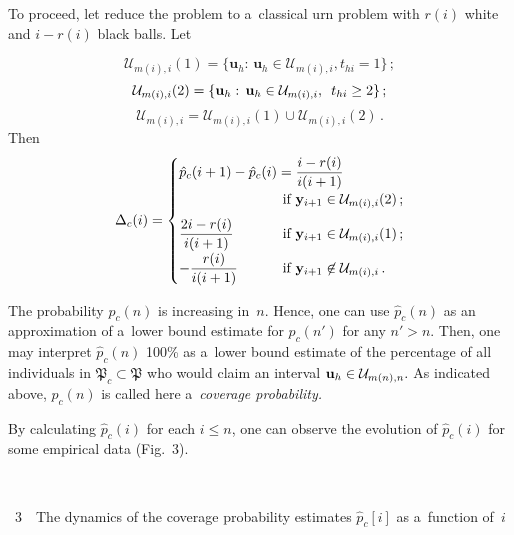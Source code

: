 \begin{multicols}{2}
To proceed, let reduce the problem to a~classical urn problem with $r(i)$
white and $i-r(i)$ black balls.
   Let 
   \pagebreak
   
   \noindent
   $$
   \mathcal{U}_{m(i), i} (1) =
   \{ \mathbf{u}_h :\, \mathbf{u}_h    \in\mathcal{U}_{m(i), i}, t_{hi} =1\}\,; 
$$
$$
\mathcal{U}_{m(i), i} (2) =\{ {\bf u}_h :\, {\bf u}_h
   \in\mathcal{U}_{m(i), i},\enskip t_{hi} \ge 2\}\,;
   $$
$$
\mathcal{U}_{m(i), i} =\mathcal{U}_{m(i), i} (1)\cup\mathcal{U}_{m(i), i}
   (2)\,.
   $$  
    Then
   $$
   \Delta_c(i) = 
   \begin{cases}
   \hat p_c(i+1) -\hat p_c (i) =\fr{i-r(i)}{i(i+1)}&\\[2pt]
&\hspace*{-20mm}     \mbox{ if }
   \mathbf{y}_{i+1} \in \mathcal{U}_{m(i), i}(2)\,;\\[6pt]
\fr{2i-r(i)}{i(i+1)} &\hspace*{-20mm}\mbox{ if } 
\mathbf{y}_{i+1} \in \mathcal{U}_{m(i), i}(1)\,;\\[6pt]
-\fr{r(i)}{i(i+1)} &   \hspace*{-20mm}\mbox{ if } 
 \mathbf{y}_{i+1} \not\in \mathcal{U}_{m(i), i}\,.
 \end{cases}
 $$

   The probability $p_c(n)$ is increasing in~$n.$ Hence, one can use $\hat p_c(n)$ as
an approximation of a~lower bound estimate for $p_c(n')$ for any 
  $n'> n.$ Then, one may   interpret $\hat p_c(n)$ 100\% as a~lower bound estimate of the
  percentage of all individuals in $\mathfrak P_c \subset \mathfrak P$
  who  would claim an interval ${\bf u}_h\in\mathcal{U}_{m(n), n}.$ As indicated above,
  $p_c(n)$ is called here a~\textit{coverage probability.}

    By calculating $\hat p_c(i)$ for each $i\le n$, one can observe
the  evolution of $\hat p_c(i)$ for some empirical data (Fig.~3).

\begin{center}  %
\vspace*{12pt}
\mbox{%
 \epsfxsize=78.234mm
 }

\end{center}


\noindent
{{\figurename~3}\ \ \small{The dynamics of the coverage probability
estimates $\hat p_c[i]$ as a~function of~$i$}}

\vspace*{9pt}


\end{multicols}
